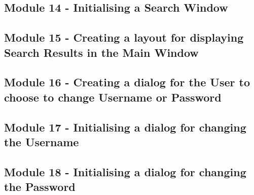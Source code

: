 \begin{landscape}
\begin{scriptsize}

\subsection{Module 14 - Initialising a Search Window}

 \label{ssec:SearchDatabase.py}

\subsection{Module 15 - Creating a layout for displaying Search Results in the Main Window}

 \label{ssec:SearchResults.py}

\subsection{Module 16 - Creating a dialog for the User to choose to change Username or Password}


\subsection{Module 17 - Initialising a dialog for changing the Username}

 \label{ssec:ChangeUsername.py}

\subsection{Module 18 - Initialising a dialog for changing the Password}

 \label{ssec:ChangePassword.py}
\end{scriptsize}
\end{landscape}






